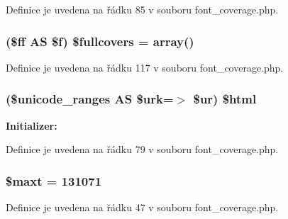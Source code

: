 Definice je uvedena na řádku 85 v souboru font\-\_\-coverage.\-php.

\hypertarget{font__coverage_8php_a21ad601587a1620504b68ce5258b9ff6}{
\subsubsection[{\$fullcovers}]{ (\$ff A\-S \$f) \$fullcovers = array()}}\label{font__coverage_8php_a21ad601587a1620504b68ce5258b9ff6}


Definice je uvedena na řádku 117 v souboru font\-\_\-coverage.\-php.

\hypertarget{font__coverage_8php_adaf3754f65c4619ab65aa55169ef684e}{
\subsubsection[{\$html}]{ (\$unicode\-\_\-ranges A\-S \$urk=$>$ \$ur) \$html}}\label{font__coverage_8php_adaf3754f65c4619ab65aa55169ef684e}
{\bfseries Initializer\-:}


Definice je uvedena na řádku 79 v souboru font\-\_\-coverage.\-php.

\hypertarget{font__coverage_8php_a6f59d03d2504b6c14d08ff0d12d56f4e}{
\subsubsection[{\$maxt}]{\setlength{\rightskip}{0pt plus 5cm}\$maxt = 131071}}\label{font__coverage_8php_a6f59d03d2504b6c14d08ff0d12d56f4e}


Definice je uvedena na řádku 47 v souboru font\-\_\-coverage.\-php.

